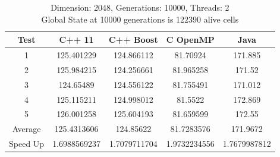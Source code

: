 \documentclass[11pt]{article} %
\begin{document}
\begin{table}[ht]

\caption{Dimension: 2048, Generations: 10000, Threads: 2\\Global State at 10000 generations is 122390 alive cells} %

\centering %

\begin{tabular}{c c c c c} %

\hline\hline %

Test & C++ 11 & C++ Boost & C OpenMP & Java \\ [0.5ex] %


\hline %

1 & 125.401229 & 124.866112 & 81.70924 & 171.885 \\
2 & 125.984215 & 124.256661 & 81.965258 & 171.52 \\
3 & 124.65489 & 124.556122 & 81.755491 & 171.012 \\
4 & 125.115211 & 124.998012 & 81.5522 & 172.869 \\
5 & 126.001258 & 125.604193 & 81.659599 & 172.55 \\
Average & 125.4313606 & 124.85622 & 81.7283576 & 171.9672 \\
Speed Up & 1.6988569237 & 1.7079711704 & 1.9732234556 & 1.7679987812 \\ [1ex]

\hline %

\end{tabular}
\end{table}
\end{document}
